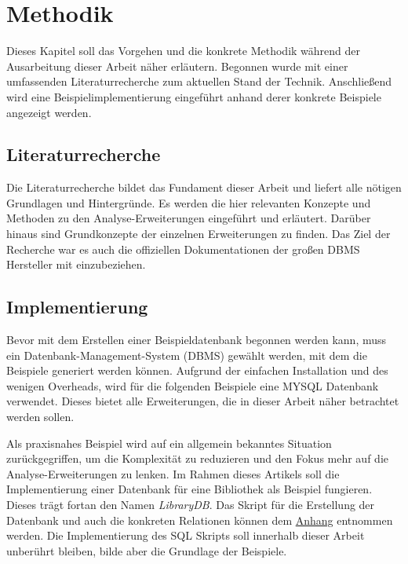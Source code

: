 \chapter{Methodik}
\label{chap:methodik} Dieses Kapitel soll das Vorgehen und die konkrete Methodik
während der Ausarbeitung dieser Arbeit näher erläutern. Begonnen wurde mit einer
umfassenden Literaturrecherche zum aktuellen Stand der Technik. Anschließend wird
eine Beispielimplementierung eingeführt anhand derer konkrete Beispiele angezeigt
werden.

\section{Literaturrecherche}
\label{sec:literaturrecherche} Die Literaturrecherche bildet das Fundament dieser
Arbeit und liefert alle nötigen Grundlagen und Hintergründe. Es werden die hier
relevanten Konzepte und Methoden zu den Analyse-Erweiterungen eingeführt und
erläutert. Darüber hinaus sind Grundkonzepte der einzelnen Erweiterungen zu finden.
Das Ziel der Recherche war es auch die offiziellen Dokumentationen der großen
DBMS Hersteller mit einzubeziehen.

\section{Implementierung}
\label{sec:implementierung} Bevor mit dem Erstellen einer Beispieldatenbank
begonnen werden kann, muss ein Datenbank-Management-System (DBMS) gewählt werden,
mit dem die Beispiele generiert werden können. Aufgrund der einfachen Installation
und des wenigen Overheads, wird für die folgenden Beispiele eine MYSQL Datenbank
verwendet. Dieses bietet alle Erweiterungen, die in dieser Arbeit näher
betrachtet werden sollen.

Als praxisnahes Beispiel wird auf ein allgemein bekanntes Situation
zurückgegriffen, um die Komplexität zu reduzieren und den Fokus mehr auf die Analyse-Erweiterungen
zu lenken. Im Rahmen dieses Artikels soll die Implementierung einer Datenbank
für eine Bibliothek als Beispiel fungieren. Dieses trägt fortan den Namen \textit{LibraryDB}.
Das Skript für die Erstellung der Datenbank und auch die konkreten Relationen können
dem \hyperref[sec:library_db]{Anhang} entnommen werden. Die Implementierung des
SQL Skripts soll innerhalb dieser Arbeit unberührt bleiben, bilde aber die Grundlage
der Beispiele.
